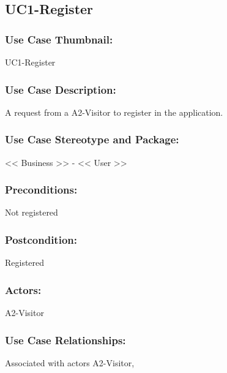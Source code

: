 \documentclass[11pt, openany]{report}
\begin{document}

\subsection{UC1-Register}
\label{UC1}
\subsubsection{Use Case Thumbnail:}
UC1-Register
\subsubsection{Use Case Description:}
A request from a A2-Visitor to register in the application.
\subsubsection{Use Case Stereotype and Package:}
<< Business >> - << User >>
\subsubsection{Preconditions:}
Not registered
\subsubsection{Postcondition:}
Registered
\subsubsection{Actors:}
A2-Visitor
\subsubsection{Use Case Relationships:}
Associated with actors A2-Visitor,
\end{document}

